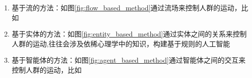 \begin{enumerate}
    \item 基于流的方法：如图\ref{fig:flow_based_method}通过流场来控制人群的运动，比如\cite{patilDirectingCrowdSimulations2011}
    \item 基于实体的方法：如图\ref{fig:entity_based_method}通过实体之间的关系来控制人群的运动,往往会涉及依稀心理学中的知识，构建基于规则的人工智能
    \item 基于智能体的方法：如图\ref{fig:agent_based_method}通过智能体之间的交互来控制人群的运动，比如\cite{tanakaGuidanceFieldVector2016}
\end{enumerate}

